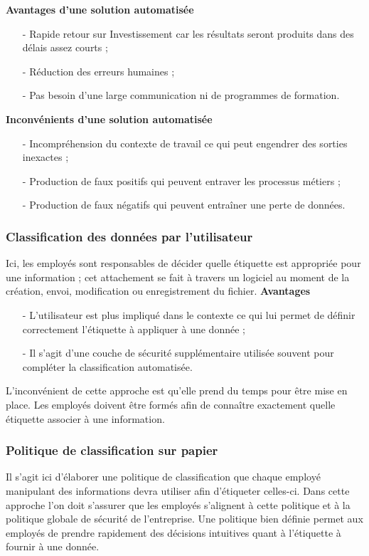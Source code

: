 \textbf{Avantages d'une solution automatisée}
\begin{itemize}
    \item[-] Rapide retour sur Investissement car les résultats seront produits dans des délais assez courts ;
    \item[-] Réduction des erreurs humaines ;
    \item[-] Pas besoin d’une large communication ni de programmes de formation.
\end{itemize}

\textbf{Inconvénients d'une solution automatisée}
\begin{itemize}
    \item[-] Incompréhension du contexte de travail ce qui peut engendrer des sorties inexactes ;
    \item[-] Production de faux positifs qui peuvent entraver les processus métiers ;
    \item[-] Production de faux négatifs qui peuvent entraîner une perte de données.
\end{itemize}

\subsubsection{Classification des données par l'utilisateur}
Ici, les employés sont responsables de décider quelle étiquette est appropriée pour une information ; cet attachement se fait à travers un logiciel au moment de la création, envoi, modification ou enregistrement du fichier.
\textbf{Avantages}
\begin{itemize}
    \item[-] L’utilisateur est plus impliqué dans le contexte ce qui lui permet de définir correctement l’étiquette à appliquer à une donnée ;
    \item[-] Il s’agit d’une couche de sécurité supplémentaire utilisée souvent pour compléter la classification automatisée.
\end{itemize}
L'inconvénient de cette approche est qu'elle prend du temps pour être mise en place. Les employés doivent être formés afin de connaître exactement quelle étiquette associer à une information.

\subsubsection{Politique de classification sur papier}
Il s’agit ici d’élaborer une politique de classification que chaque employé manipulant des informations devra utiliser afin d’étiqueter celles-ci. Dans cette approche l’on doit s’assurer que les employés s’alignent à cette politique et à la politique globale de sécurité de l’entreprise. Une politique bien définie permet aux employés de prendre rapidement des décisions intuitives quant à l’étiquette à fournir à une donnée. 


